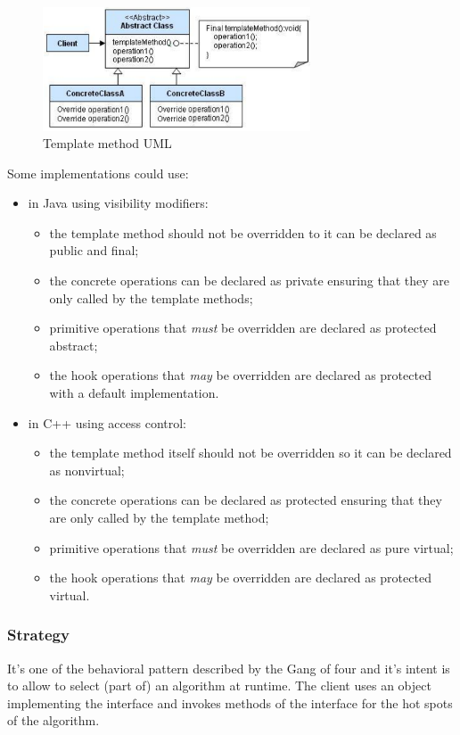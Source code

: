 \begin{figure}[H]
    \centering
    \includegraphics[width=300px]{images/9_Frameworks/template_method_UML.png}
    \caption{Template method UML}
\end{figure}

Some implementations could use:
\begin{itemize}
    \item in Java using visibility modifiers:
    \begin{itemize}
        \item the template method should not be overridden to it can be declared as public and final;
        \item the concrete operations can be declared as private ensuring that they are only called by the template methods;
        \item primitive operations that \emph{must} be overridden are declared as protected abstract;
        \item the hook operations that \emph{may} be overridden are declared as protected with a default implementation.
    \end{itemize}

    \item in C++ using access control:
    \begin{itemize}
        \item the template method itself should not be overridden so it can be declared as nonvirtual;
        \item the concrete operations can be declared as protected ensuring that they are only called by the template method;
        \item primitive operations that \emph{must} be overridden are declared as pure virtual;
        \item the hook operations that \emph{may} be overridden are declared as protected virtual.
    \end{itemize}
\end{itemize}

\subsubsection{Strategy}
It's one of the behavioral pattern described by the Gang of four and it's intent is to allow to select (part of) an algorithm at runtime.
The client uses an object implementing the interface and invokes methods of the interface for the hot spots of the algorithm.

